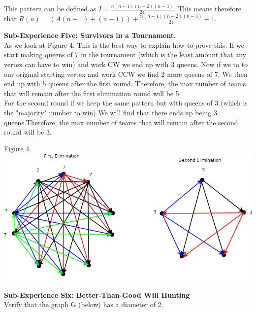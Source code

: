 \documentclass[10pt,a4paper]{report}
\begin{document}
	\noindent This pattern can be defined as $I=\frac{n(n-1)(n-2)(n-3)}{24}$.  This means therefore that $R(n)=(A(n-1)+(n-1))+\frac{n(n-1)(n-2)(n-3)}{24}+1$.
	
		\begin{center}
	
		\end{center}
	\textbf{Sub-Experience Five: Survivors in a Tournament.}\\
		As we look at Figure 4. This is the best way to explain how to prove this.  If we start making queens of 7 in the tournament (which is the least amount that any vertex can have to win) and work CW we end up with 3 queens. Now if we to to our original starting vertex and work CCW we find 2 more queens of 7.  We then end up with 5 queens after the first round.  Therefore, the max number of teams that will remain after the first elimination round will be 5.\\
		\newline
		For the second round if we keep the same pattern but with queens of 3 (which is the "majority" number to win) We will find that there ends up being 3 queens.Therefore, the max number of teams that will remain after the second round will be 3.\\
		\begin{center}
			Figure 4.\\
			\includegraphics[scale=.5]{e5.png}
			\newline
			\newline
		\end{center}
	\textbf{Sub-Experience Six: Better-Than-Good Will Hunting}\\
		Verify that the graph G (below) has a diameter of 2.\\
		
\end{document}
